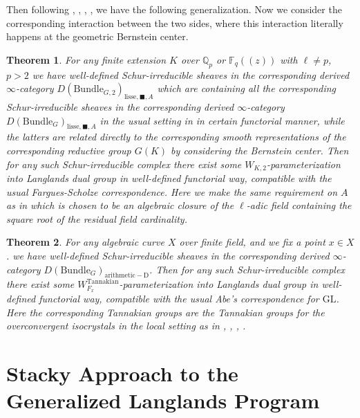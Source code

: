 \documentclass[12pt]{book}
\newtheorem{theorem}{Theorem}
\theoremstyle{definition}
\begin{document}
\indent Then following \cite{VLa}, \cite{FS}, \cite{AI}, \cite{KI}, \cite{KXII} we have the following generalization. Now we consider the corresponding interaction between the two sides, where this interaction literally happens at the geometric Bernstein center.

\begin{theorem}
For any finite extension $K$ over $\mathbb{Q}_p$ or $\mathbb{F}_q((z))$ with $\ell\neq p$, $p>2$ we have well-defined Schur-irreducible sheaves in the corresponding derived $\infty$-category $D(\mathrm{Bundle}_{G,2})_{\text{lisse},\blacksquare,A}$ which are containing all the corresponding Schur-irreducible sheaves in the corresponding derived $\infty$-category $D(\mathrm{Bundle}_{G})_{\text{lisse},\blacksquare,A}$ in the usual setting in \cite{FS} in certain functorial manner, while the latters are related directly to the corresponding smooth representations of the corresponding reductive group $G(K)$ by considering the Bernstein center. Then for any such Schur-irreducible complex there exist some $W_{K,2}$-parameterization into Langlands dual group in well-defined functorial way, compatible with the usual Fargues-Scholze correspondence. Here we make the same requirement on $A$ as in \cite{FS} which is chosen to be an algebraic closure of the $\ell$-adic field containing the square root of the residual field cardinality.
\end{theorem}

\begin{theorem}
For any algebraic curve $X$ over finite field, and we fix a point $x\in X$. we have well-defined Schur-irreducible sheaves in the corresponding derived $\infty$-category $D(\mathrm{Bundle}_{G})_{\mathrm{arithmetic-D}}$. Then for any such Schur-irreducible complex there exist some $W^\mathrm{Tannakian}_{F_x}$-parameterization into Langlands dual group in well-defined functorial way, compatible with the usual Abe's correspondence for $\mathrm{GL}$. Here the corresponding Tannakian groups are the Tannakian groups for the overconvergent isocrystals in the local setting as in \cite{AI}, \cite{KI}, \cite{KXII}, \cite{DK}.
\end{theorem}







\newpage
\chapter{Stacky Approach to the Generalized Langlands Program}
\end{document}
